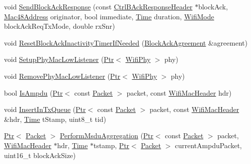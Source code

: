 \begin{DoxyCompactItemize}
\item 
void \hyperlink{classns3_1_1MacLow_a85c374be43ba3bd52fd1ad6efdfef6c6}{Send\+Block\+Ack\+Response} (const \hyperlink{classns3_1_1CtrlBAckResponseHeader}{Ctrl\+B\+Ack\+Response\+Header} $\ast$block\+Ack, \hyperlink{classns3_1_1Mac48Address}{Mac48\+Address} originator, bool immediate, \hyperlink{classns3_1_1Time}{Time} duration, \hyperlink{classns3_1_1WifiMode}{Wifi\+Mode} block\+Ack\+Req\+Tx\+Mode, double rx\+Snr)
\item 
void \hyperlink{classns3_1_1MacLow_aafa012c5d2dde80484d6546c802f02f8}{Reset\+Block\+Ack\+Inactivity\+Timer\+If\+Needed} (\hyperlink{classns3_1_1BlockAckAgreement}{Block\+Ack\+Agreement} \&agreement)
\item 
void \hyperlink{classns3_1_1MacLow_afc8981535d8f7e161bf58d4d86b7f15f}{Setup\+Phy\+Mac\+Low\+Listener} (\hyperlink{classns3_1_1Ptr}{Ptr}$<$ \hyperlink{classns3_1_1WifiPhy}{Wifi\+Phy} $>$ phy)
\item 
void \hyperlink{classns3_1_1MacLow_afc60cdc4693e2fb6b2257aa015b9ec30}{Remove\+Phy\+Mac\+Low\+Listener} (\hyperlink{classns3_1_1Ptr}{Ptr}$<$ \hyperlink{classns3_1_1WifiPhy}{Wifi\+Phy} $>$ phy)
\item 
bool \hyperlink{classns3_1_1MacLow_a228f675a7db0df0e39edb611167861cc}{Is\+Ampdu} (\hyperlink{classns3_1_1Ptr}{Ptr}$<$ const \hyperlink{classns3_1_1Packet}{Packet} $>$ packet, const \hyperlink{classns3_1_1WifiMacHeader}{Wifi\+Mac\+Header} hdr)
\item 
void \hyperlink{classns3_1_1MacLow_a4b03d2fed3abc0e1acc14b3b1ef808a1}{Insert\+In\+Tx\+Queue} (\hyperlink{classns3_1_1Ptr}{Ptr}$<$ const \hyperlink{classns3_1_1Packet}{Packet} $>$ packet, const \hyperlink{classns3_1_1WifiMacHeader}{Wifi\+Mac\+Header} \&hdr, \hyperlink{classns3_1_1Time}{Time} t\+Stamp, uint8\+\_\+t tid)
\item 
\hyperlink{classns3_1_1Ptr}{Ptr}$<$ \hyperlink{classns3_1_1Packet}{Packet} $>$ \hyperlink{classns3_1_1MacLow_aabd112b43fd3be901c743b21d41f787f}{Perform\+Msdu\+Aggregation} (\hyperlink{classns3_1_1Ptr}{Ptr}$<$ const \hyperlink{classns3_1_1Packet}{Packet} $>$ packet, \hyperlink{classns3_1_1WifiMacHeader}{Wifi\+Mac\+Header} $\ast$hdr, \hyperlink{classns3_1_1Time}{Time} $\ast$tstamp, \hyperlink{classns3_1_1Ptr}{Ptr}$<$ \hyperlink{classns3_1_1Packet}{Packet} $>$ current\+Ampdu\+Packet, uint16\+\_\+t block\+Ack\+Size)
\end{DoxyCompactItemize}
